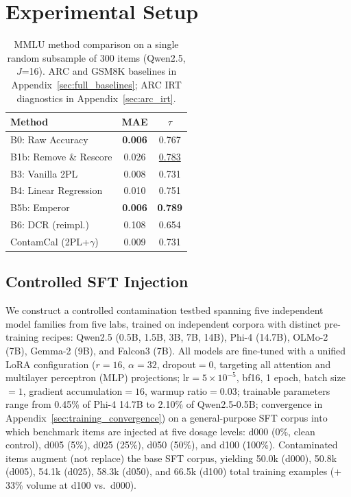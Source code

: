\section{Experimental Setup}
\label{sec:experiments}

\begin{table}[t]
\centering
\caption{MMLU method comparison on a single random subsample of 300 items (Qwen2.5, $J$=16). ARC and GSM8K baselines in Appendix~\ref{sec:full_baselines}; ARC IRT diagnostics in Appendix~\ref{sec:arc_irt}.}
\label{tab:baselines}
\footnotesize
\begin{tabular}{lcc}
\toprule
Method & MAE & $\tau$ \\
\midrule
B0: Raw Accuracy & \textbf{0.006} & 0.767 \\
B1b: Remove \& Rescore & 0.026 & \underline{0.783} \\
B3: Vanilla 2PL & 0.008 & 0.731 \\
B4: Linear Regression & 0.010 & 0.751 \\
B5b: Emperor & \textbf{0.006} & \textbf{0.789} \\
B6: DCR (reimpl.) & 0.108 & 0.654 \\
ContamCal (2PL+$\gamma$) & 0.009 & 0.731 \\
\bottomrule
\end{tabular}
\end{table}

\subsection{Controlled SFT Injection}
\label{sec:injection}

We construct a controlled contamination testbed spanning five independent model families from five labs, trained on independent corpora with distinct pre-training recipes: Qwen2.5 \citep{qwen2024qwen25} (0.5B, 1.5B, 3B, 7B, 14B), Phi-4 \citep{abdin2024phi4} (14.7B), OLMo-2 \citep{olmo2team2025} (7B), Gemma-2 \citep{gemmateam2024gemma2} (9B), and Falcon3 \citep{tiiuae2024falcon3} (7B). All models are fine-tuned with a unified LoRA configuration \citep{hu2022lora} ($r=16$, $\alpha=32$, dropout$=0$, targeting all attention and multilayer perceptron (MLP) projections; lr$=5\times10^{-5}$, bf16, 1 epoch, batch size$=1$, gradient accumulation$=16$, warmup ratio$=0.03$; trainable parameters range from 0.45\% of Phi-4 14.7B to 2.10\% of Qwen2.5-0.5B; convergence in Appendix~\ref{sec:training_convergence}) on a general-purpose SFT corpus into which benchmark items are injected at five dosage levels: d000 (0\%, clean control), d005 (5\%), d025 (25\%), d050 (50\%), and d100 (100\%). Contaminated items augment (not replace) the base SFT corpus, yielding 50.0k (d000), 50.8k (d005), 54.1k (d025), 58.3k (d050), and 66.5k (d100) total training examples ($+$33\% volume at d100 vs.\ d000).

